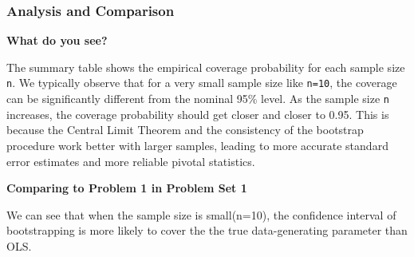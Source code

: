 \documentclass[11pt]{article}
\begin{document}
    \subsubsection{Analysis and Comparison}\label{analysis-and-comparison}

\textbf{What do you see?}

The summary table shows the empirical coverage probability for each
sample size \texttt{n}. We typically observe that for a very small
sample size like \texttt{n=10}, the coverage can be significantly
different from the nominal 95\% level. As the sample size \texttt{n}
increases, the coverage probability should get closer and closer to
0.95. This is because the Central Limit Theorem and the consistency of
the bootstrap procedure work better with larger samples, leading to more
accurate standard error estimates and more reliable pivotal statistics.

\textbf{Comparing to Problem 1 in Problem Set 1}

We can see that when the sample size is small(n=10), the confidence
interval of bootstrapping is more likely to cover the the true
data-generating parameter than OLS.


    
    
    
\end{document}
